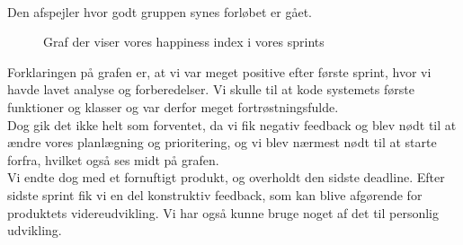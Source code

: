 \\
Den afspejler hvor godt gruppen synes forløbet er gået.
\begin{figure}[H]
    \caption{Graf der viser vores happiness index i vores sprints}
    \label{fig:happi}
\end{figure}
\noindent
Forklaringen på grafen er, at vi var meget positive efter første sprint, hvor vi havde lavet analyse og forberedelser.
Vi skulle til at kode systemets første funktioner og klasser og var derfor meget fortrøstningsfulde.
\\
Dog gik det ikke helt som forventet, da vi fik negativ feedback og blev nødt til at ændre vores planlægning og prioritering,
og vi blev nærmest nødt til at starte forfra, hvilket også ses midt på grafen.
\\
Vi endte dog med et fornuftigt produkt, og overholdt den sidste deadline. Efter sidste sprint fik vi en del konstruktiv feedback, 
som kan blive afgørende for produktets videreudvikling. Vi har også kunne bruge noget af det til personlig udvikling.

